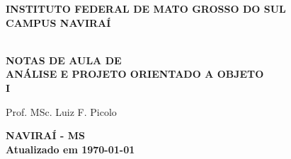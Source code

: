 \thispagestyle{empty}

\vfill
 \begin{center}
    
    {\large\bfseries INSTITUTO FEDERAL DE MATO GROSSO DO SUL} \\
    
    {\large\bfseries CAMPUS NAVIRAÍ}  \\ 

    \vspace*{1in}

    \vspace*{4cm}
    \noindent \\
    
    \large\bfseries{NOTAS DE AULA DE} \\
    \huge\bfseries{ANÁLISE E PROJETO ORIENTADO A OBJETO} \\ I
    
    \vspace*{4cm}
    
    \large{Prof. MSc. Luiz F. Picolo}
    
    \vfill
    \large\bfseries{NAVIRAÍ - MS} \\ 
    \vspace{0.2cm}
    \small Atualizado em \today
\end{center}

\normalsize


